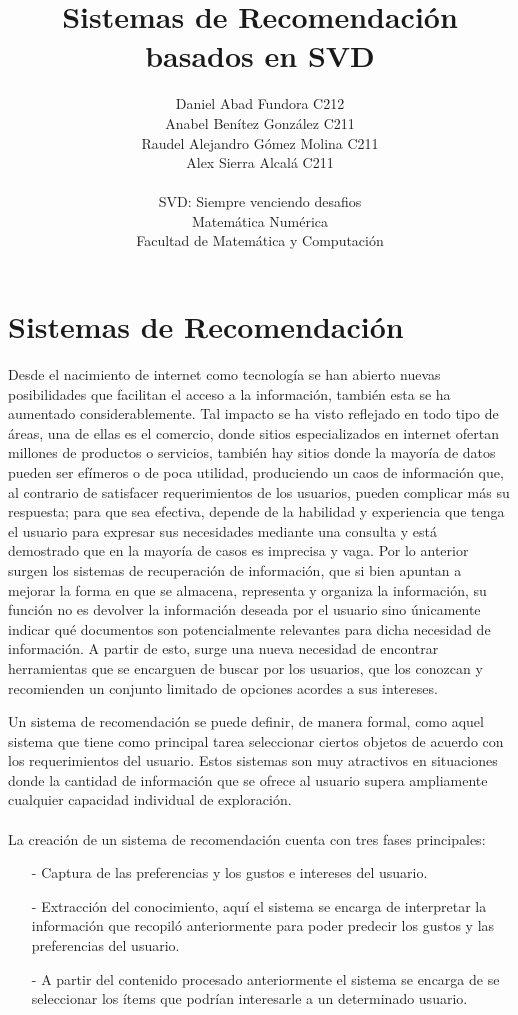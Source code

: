 \documentclass{article}
\title{Sistemas de Recomendación basados en SVD}
\author{Daniel Abad Fundora C212\\
		Anabel Benítez González C211\\
		Raudel Alejandro Gómez Molina C211\\
		Alex Sierra Alcalá C211\\\\		
  \small SVD: Siempre venciendo desafios\\
  \small Matemática Numérica\\
  \small Facultad de Matemática y Computación 
}
\begin{document}
\maketitle

\section{Sistemas de Recomendación}

Desde el nacimiento de internet como tecnología se han abierto nuevas posibilidades que facilitan el acceso a la información, también esta se ha aumentado considerablemente. Tal impacto se ha visto reflejado en todo tipo de áreas, una de ellas es el comercio, donde sitios especializados en internet ofertan millones de productos o servicios, también hay sitios donde la 
mayoría de datos pueden ser efímeros o de poca utilidad, produciendo un caos de información que, al contrario de satisfacer requerimientos de los usuarios, pueden complicar más su respuesta; para que sea efectiva, depende de la habilidad y experiencia que tenga el usuario para expresar sus necesidades mediante una consulta y está demostrado que en la mayoría de casos es imprecisa y vaga. Por lo anterior surgen los sistemas de recuperación de información, que si bien apuntan a mejorar la forma en que se almacena, representa y organiza la información, su función no es devolver la información deseada por el usuario sino únicamente indicar qué documentos son potencialmente relevantes para dicha necesidad de información. A partir de esto, surge una nueva necesidad de encontrar herramientas que se encarguen de buscar por los usuarios, que los conozcan y recomienden un conjunto limitado de opciones acordes a sus intereses. 

Un sistema de recomendación se puede definir, de manera formal, como aquel sistema que tiene como principal tarea seleccionar ciertos objetos de acuerdo con los requerimientos del usuario. Estos sistemas son muy atractivos en situaciones donde la cantidad de información que se ofrece al usuario supera ampliamente cualquier capacidad individual de exploración.\\\\
La creación de un sistema de recomendación cuenta con tres fases principales:
\begin{enumerate}
	\item[-] Captura de las preferencias y los gustos e intereses del usuario.
	\item[-] Extracción del conocimiento, aquí el sistema se encarga de interpretar la información que recopiló anteriormente para poder predecir los gustos y las preferencias del usuario.
	\item[-] A partir del contenido procesado anteriormente el sistema se encarga de se seleccionar los ítems que podrían interesarle a un determinado usuario.
\end{enumerate}
\end{document}
